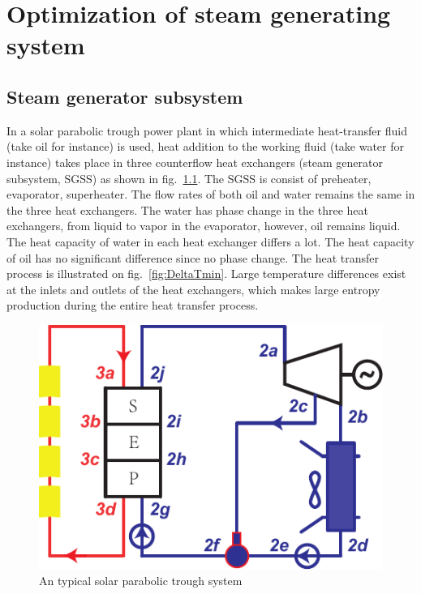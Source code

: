 \chapter{Optimization of steam generating system}
\section{Steam generator subsystem}

In a solar parabolic trough power plant in which intermediate heat-transfer fluid (take oil for instance) is used, heat addition to the working fluid (take water for instance) takes place in three counterflow heat exchangers (steam generator subsystem, SGSS) as shown in fig.~\ref{fig:PTC}. The SGSS is consist of preheater, evaporator, superheater. The flow rates of both oil and water remains the same in the three heat exchangers. 
The water has phase change in the three heat exchangers, from liquid to vapor in the evaporator, however, oil remains liquid. The heat capacity of water in each heat exchanger differs a lot. The heat capacity of oil has no significant difference since no phase change. The heat transfer process is illustrated on fig.~\ref{fig:DeltaTmin}. Large temperature differences exist at the inlets and outlets of the heat exchangers, which makes large entropy production during the entire heat transfer process.


\noindent \begin{figure}[htbp]
\begin{center}
	\includegraphics[width = 0.7\columnwidth]{fig/PTC}
	\caption{An typical solar parabolic trough system}
	\label{fig:PTC}
\end{center}
\end{figure}

